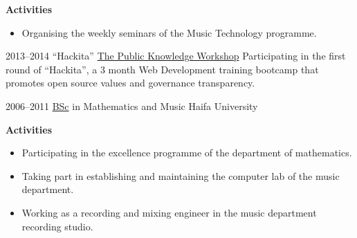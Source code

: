 \documentclass[]{friggeri-cv}
\begin{document}
\begin{entrylist}
{    \textbf{Activities}
    \begin{itemize}
      \item
        Organising the weekly seminars of the Music Technology programme.
    \end{itemize}
  }

  \entry
  {2013--2014}
  {“Hackita”}
  {\href{https://www.hasadna.org.il/en/}{The Public Knowledge Workshop}}
  {Participating in the first round of ``Hackita'', a 3 month Web Development training bootcamp that promotes open source values and governance transparency.}

  \entry
  {2006--2011}
  {\href{http://www.tomgurion.me/pdfs/BSc.pdf}{BSc} in Mathematics and Music}
  {Haifa University}
  {
    \textbf{Activities}
    \begin{itemize}
      \item
        Participating in the excellence programme of the department of mathematics.
      \item
        Taking part in establishing and maintaining the computer lab of the music department.
      \item
        Working as a recording and mixing engineer in the music department recording studio.
    \end{itemize}
  }

\end{entrylist}
\end{document}
